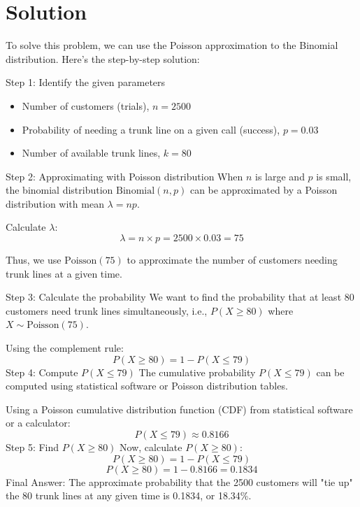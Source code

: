 \documentclass{article}
\begin{document}
\section*{Solution}

To solve this problem, we can use the Poisson approximation to the Binomial distribution. Here’s the step-by-step solution:

Step 1: Identify the given parameters
\begin{itemize}
    \item Number of customers (trials), \( n = 2500 \)
    \item Probability of needing a trunk line on a given call (success), \( p = 0.03 \)
    \item Number of available trunk lines, \( k = 80 \)
\end{itemize}

Step 2: Approximating with Poisson distribution
When \(n\) is large and \(p\) is small, the binomial distribution \( \text{Binomial}(n, p) \) can be approximated by a Poisson distribution with mean \( \lambda = np \).

Calculate \( \lambda \):
\[
\lambda = n \times p = 2500 \times 0.03 = 75
\]

Thus, we use \( \text{Poisson}(75) \) to approximate the number of customers needing trunk lines at a given time.
\newline

Step 3: Calculate the probability
We want to find the probability that at least 80 customers need trunk lines simultaneously, i.e., \(P(X \geq 80)\) where \(X \sim \text{Poisson}(75)\).

Using the complement rule:
\[
P(X \geq 80) = 1 - P(X \leq 79)
\]
\newline
Step 4: Compute \(P(X \leq 79)\)
The cumulative probability \(P(X \leq 79)\) can be computed using statistical software or Poisson distribution tables.

Using a Poisson cumulative distribution function (CDF) from statistical software or a calculator:
\[
P(X \leq 79) \approx 0.8166
\]
\newline
Step 5: Find \(P(X \geq 80)\)
Now, calculate \(P(X \geq 80)\):
\[
P(X \geq 80) = 1 - P(X \leq 79)
\]
\[
P(X \geq 80) = 1 - 0.8166 = 0.1834
\]
\newline
Final Answer:
\newline
The approximate probability that the 2500 customers will "tie up" the 80 trunk lines at any given time is 0.1834, or 18.34\%.
\newpage
\end{document}
